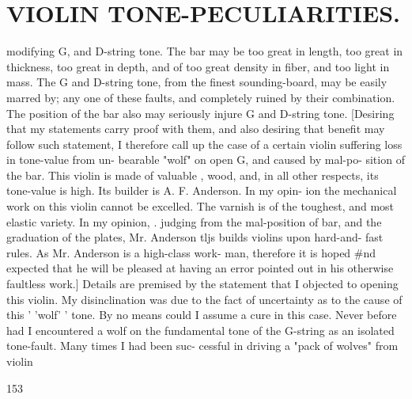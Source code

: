 \documentclass{article}
\begin{document}
\section*{VIOLIN TONE-PECULIARITIES.}
modifying G, and D-string tone. The bar may be too great in length, too great in thickness, too great in depth, and of too great density in fiber, and too light in mass. The G and D-string tone, from the finest sounding-board, may be easily marred by; any one of these faults, and completely ruined by their combination. The position of the bar also may seriously injure G and D-string tone. [Desiring that my statements carry proof with them, and also desiring that benefit may follow such statement, I therefore call up the case of a certain violin suffering loss in tone-value from un- bearable "wolf" on open G, and caused by mal-po- sition of the bar. This violin is made of valuable , wood, and, in all other respects, its tone-value is high. Its builder is A. F. Anderson. In my opin- ion the mechanical work on this violin cannot be excelled. The varnish is of the toughest, and most elastic variety. In my opinion, . judging from the mal-position of bar, and the graduation of the plates, Mr. Anderson tljs builds violins upon hard-and- fast rules. As Mr. Anderson is a high-class work- man, therefore it is hoped \#nd expected that he will be pleased at having an error pointed out in his otherwise faultless work.] Details are premised by the statement that I objected to opening this violin. My disinclination was due to the fact of uncertainty as to the cause of this ' 'wolf' ' tone. By no means could I assume a cure in this case. Never before had I encountered a wolf on the fundamental tone of the G-string as an isolated tone-fault. Many times I had been suc- cessful in driving a "pack of wolves" from violin

153
\end{document}
